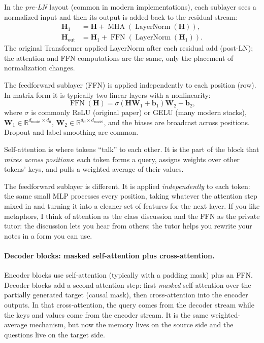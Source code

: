 In the \emph{pre-LN} layout (common in modern implementations), each sublayer sees a normalized input and then its output is
added back to the residual stream:
\begin{equation}
\begin{aligned}
\mathbf{H}_1 &= \mathbf{H} + \operatorname{MHA}(\operatorname{LayerNorm}(\mathbf{H})),\\
\mathbf{H}_{\text{out}} &= \mathbf{H}_1 + \operatorname{FFN}(\operatorname{LayerNorm}(\mathbf{H}_1)).
\end{aligned}
\label{eq:transformers_preln_block}
\end{equation}
The original Transformer applied LayerNorm after each residual add (post-LN); the attention and FFN computations are the same,
only the placement of normalization changes.

The feedforward sublayer (FFN) is applied independently to each position (row). In matrix form it is typically two linear
layers with a nonlinearity:
\begin{equation}
    \operatorname{FFN}(\mathbf{H})
    = \sigma(\mathbf{H}\mathbf{W}_1 + \mathbf{b}_1)\mathbf{W}_2 + \mathbf{b}_2,
    \label{eq:transformers_ffn}
\end{equation}
where \(\sigma\) is commonly ReLU (original paper) or GELU (many modern stacks), \(\mathbf{W}_1\in\mathbb{R}^{d_{\text{model}}\times d_{\text{ff}}}\),
\(\mathbf{W}_2\in\mathbb{R}^{d_{\text{ff}}\times d_{\text{model}}}\), and the biases are broadcast across positions. Dropout and label smoothing are common.

\begin{tcolorbox}[summarybox, title={Author's note: attention mixes; the FFN refines (two different jobs)}]
Self-attention is where tokens ``talk'' to each other. It is the part of the block that \emph{mixes across positions}: each token forms a query, assigns weights over other tokens' keys, and pulls a weighted average of their values.

The feedforward sublayer is different. It is applied \emph{independently} to each token: the same small MLP processes every position, taking whatever the attention step mixed in and turning it into a cleaner set of features for the next layer. If you like metaphors, I think of attention as the class discussion and the FFN as the private tutor: the discussion lets you hear from others; the tutor helps you rewrite your notes in a form you can use.
\end{tcolorbox}

\paragraph{Decoder blocks: masked self-attention plus cross-attention.}
Encoder blocks use self-attention (typically with a padding mask) plus an FFN. Decoder blocks add a second attention step: first \emph{masked} self-attention over the partially generated target (causal mask), then cross-attention into the encoder outputs. In that cross-attention, the query comes from the decoder stream while the keys and values come from the encoder stream. It is the same weighted-average mechanism, but now the memory lives on the source side and the questions live on the target side.

